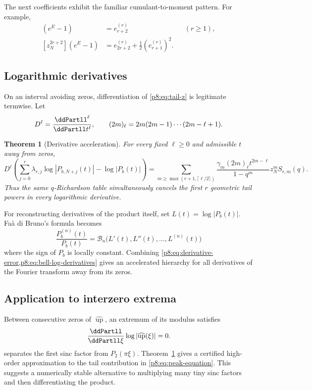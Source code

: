 \documentclass[11pt]{article}
\numberwithin{equation}{section}
\newtheorem{theorem}{Theorem}[section]
\theoremstyle{definition}
\theoremstyle{remark}
\newcommand{\Up}{\operatorname{up}}
\begin{document}
The next coefficients exhibit the familiar cumulant-to-moment pattern. For example,
\begin{align*}
[z_N^{r+2}]\left(e^E-1\right)&=e_{r+2}^{(r)}
&& (r\ge1),\\
[z_N^{2r+2}]\left(e^E-1\right)&=e_{2r+2}^{(r)}+\frac12(e_{r+1}^{(r)})^2.
\end{align*}

\subsection{Logarithmic derivatives}

On an interval avoiding zeros, differentiation of \cref{p8:eq:tail-z} is legitimate termwise. Let
\[
D^\ell=\frac{\ddPartll^\ell}{\ddPartll t^\ell},\qquad
(2m)_{\ell}=2m(2m-1)\cdots(2m-\ell+1).
\]

\begin{theorem}[Derivative acceleration]
\label{p8:thm:derivative-accel}
For every fixed $\ell\ge0$ and admissible $t$ away from zeros,
\begin{equation}
D^\ell\!\left(
\sum_{j=0}^{r}\lambda_{r,j}\log|P_{b,N+j}(t)|
-\log|P_b(t)|\right)
=
\sum_{m\ge\max(r+1,\lceil\ell/2\rceil)}
\frac{\gamma_m(2m)_\ell t^{2m-\ell}}
{1-q^m}z_N^mS_{r,m}(q).
\label{p8:eq:derivative-error}
\end{equation}
Thus the same $q$-Richardson table simultaneously cancels the first $r$ geometric tail powers in every logarithmic derivative.
\end{theorem}

For reconstructing derivatives of the product itself, set $L(t)=\log|P_b(t)|$. Fa\`a di Bruno's formula becomes
\begin{equation}
\frac{P_b^{(n)}(t)}{P_b(t)}
=\mathcal B_n\bigl(L'(t),L''(t),\ldots,L^{(n)}(t)\bigr)
\label{p8:eq:bell-log-derivatives}
\end{equation}
where the sign of $P_b$ is locally constant. Combining \cref{p8:eq:derivative-error,p8:eq:bell-log-derivatives} gives an accelerated hierarchy for all derivatives of the Fourier transform away from its zeros.

\subsection{Application to interzero extrema}

Between consecutive zeros of $\widehat{\Up}$, an extremum of its modulus satisfies
\begin{equation}
\frac{\ddPartll}{\ddPartll\xi}\log|\widehat{\Up}(\xi)|=0.
\label{p8:eq:peak-equation}
\end{equation}
 separates the first sinc factor from $P_2(\pi\xi)$. Theorem~\ref{p8:thm:derivative-accel} gives a certified high-order approximation to the tail contribution in \cref{p8:eq:peak-equation}. This suggests a numerically stable alternative to multiplying many tiny sinc factors and then differentiating the product.
\end{document}
